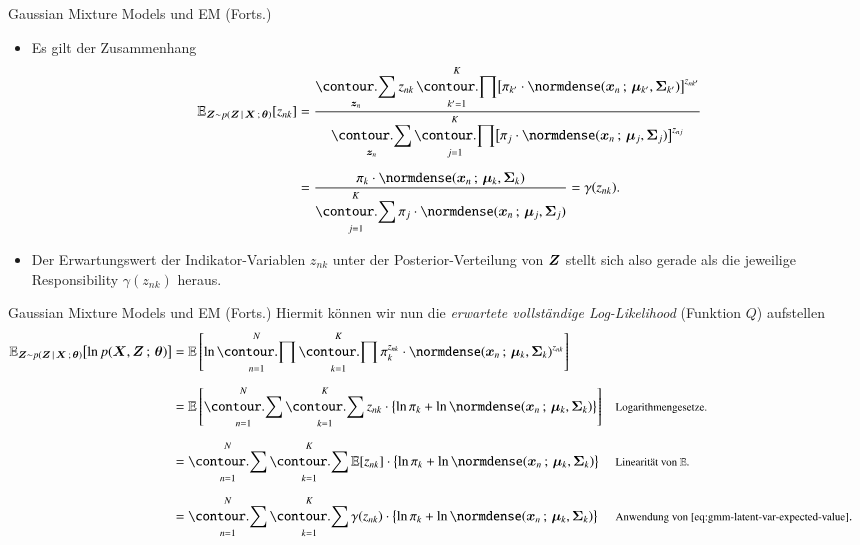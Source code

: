 \begin{frame}{Gaussian Mixture Models und EM (Forts.)}{}
	\begin{itemize}
		\item Es gilt der Zusammenhang
		\begin{equation} \label{eq:gmm-latent-var-expected-value}
			\begin{aligned}
				\E_{\bZ \sim p(\bZ\,\mid\,\bX \param \btheta)}[z_{nk}]
					&= \frac{
						\displaystyle\sum_{\bz_n} z_{nk} \prod_{k'=1}^K \bigl[ \pi_{k'}
							\cdot \normdense(\bx_n \param \bmu_{k'}, \bSigma_{k'}) \bigr]^{z_{nk'}}
					}{
						\displaystyle\sum_{\bz_n} \prod_{j=1}^K \bigl[ \pi_j
							\cdot \normdense(\bx_n \param \bmu_j, \bSigma_j) \bigr]^{z_{nj}}
					}
			\\[2mm]
					&= \frac{
						\pi_k \cdot \normdense(\bx_n \param \bmu_k, \bSigma_k)
					}{
						\displaystyle\sum_{j=1}^K \pi_j \cdot \normdense(\bx_n \param \bmu_j, \bSigma_j)
					}
						= \gamma(z_{nk}).
			\end{aligned}
		\end{equation}
		\item Der Erwartungswert der Indikator-Variablen $z_{nk}$ unter der Posterior-Verteilung von $\bm{Z}$
			stellt sich also gerade als die jeweilige Responsibility $\gamma(z_{nk})$ heraus.
	\end{itemize}
\end{frame}


\begin{frame}{Gaussian Mixture Models und EM (Forts.)}{}
	Hiermit können wir nun die \textit{erwartete vollständige Log-Likelihood} (Funktion $Q$) aufstellen
	\begin{equation} \label{eq:gmm-expected-complete-log-likelihood}
		\begin{aligned}
			\E_{\bZ \sim p(\bZ\,\mid\,\bX \param \btheta)}\bigl[ \ln p(\bX, \bZ \param \btheta) \bigr]
				&= \E\left[
					\ln \prod_{n=1}^N \prod_{k=1}^K \pi_k^{z_{nk}} \cdot \normdense(\bx_n \param \bmu_k, \bSigma_k)^{z_{nk}}
				\right]
		\\[2mm]
				&= \E\left[
					\sum_{n=1}^N \sum_{k=1}^K z_{nk} \cdot \bigl\{ \ln \pi_k + \ln \normdense(\bx_n \param \bmu_k, \bSigma_k) \bigr\}
				\right]
				&& \rem{Logarithmengesetze.}
		\\[2mm]
				&= \sum_{n=1}^N \sum_{k=1}^K \E[z_{nk}] \cdot \bigl\{ \ln \pi_k + \ln \normdense(\bx_n \param \bmu_k, \bSigma_k) \bigr\}
				&& \rem{Linearität von $\E$.}
		\\[2mm]
				&= \sum_{n=1}^N \sum_{k=1}^K \gamma(z_{nk}) \cdot \bigl\{ \ln \pi_k + \ln \normdense(\bx_n \param \bmu_k, \bSigma_k) \bigr\}
				&& \rem{Anwendung von \eqref{eq:gmm-latent-var-expected-value}}.
		\end{aligned}
	\end{equation}
\end{frame}


